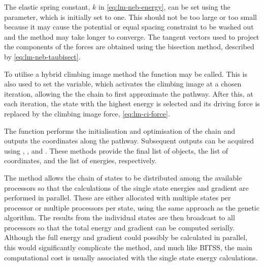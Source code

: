 The elastic spring constant, $k$ in \cref{eq:lm-neb-energy}, can be set using the  parameter, which is initially set to one.
This should not be too large or too small because it may cause the potential or equal spacing constraint to be washed out and the method may take longer to converge.
The tangent vectors used to project the components of the forces are obtained using the bisection method, described by \cref{eq:lm-neb-taubisect}.

To utilise a hybrid climbing image method the  function may be called.
This is also used to set the  variable, which activates the climbing image at a chosen iteration, allowing the the chain to first approximate the pathway.
After this, at each iteration, the state with the highest energy is selected and its driving force is replaced by the climbing image force, \cref{eq:lm-ci-force}.

The  function performs the initialisation and optimisation of the chain and outputs the coordinates along the pathway.
Subsequent outputs can be acquired using , , and .
These methods provide the final list of  objects, the list of coordinates, and the list of energies, respectively.

The method allows the chain of states to be distributed among the available processors so that the calculations of the single state energies and gradient are performed in parallel.
These are either allocated with multiple states per processor or multiple processors per state, using the same approach as the genetic algorithm.
The results from the individual states are then broadcast to all processors so that the total energy and gradient can be computed serially.
Although the full energy and gradient could possibly be calculated in parallel, this would significantly complicate the method, and much like BITSS, the main computational cost is usually associated with the single state energy calculations.


